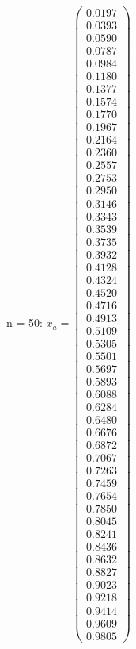 \documentclass{udpreport}
\begin{document}
\begin{enumerate}
\begin{enumerate}
{{{{\begin{itemize}
\begin{itemize}
				n = 50: $x_{a} = \left(\begin{array}{c} 0.0197\\ 0.0393\\ 0.0590\\ 0.0787\\ 0.0984\\ 0.1180\\ 0.1377\\ 0.1574\\ 0.1770\\ 0.1967\\ 0.2164\\ 0.2360\\ 0.2557\\ 0.2753\\ 0.2950\\ 0.3146\\ 0.3343\\ 0.3539\\ 0.3735\\ 0.3932\\ 0.4128\\ 0.4324\\ 0.4520\\ 0.4716\\ 0.4913\\ 0.5109\\ 0.5305\\ 0.5501\\ 0.5697\\ 0.5893\\ 0.6088\\ 0.6284\\ 0.6480\\ 0.6676\\ 0.6872\\ 0.7067\\ 0.7263\\ 0.7459\\ 0.7654\\ 0.7850\\ 0.8045\\ 0.8241\\ 0.8436\\ 0.8632\\ 0.8827\\ 0.9023\\ 0.9218\\ 0.9414\\ 0.9609\\ 0.9805 \end{array}\right)$
				

\end{itemize}
\end{itemize}}}}}
\end{enumerate}
\end{enumerate}
\end{document}
